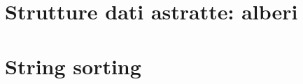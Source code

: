 \documentclass[italian, twoside]{../../../Resources/Utils/ClassNotes}
\begin{document}

\section{Strutture dati astratte: alberi}


\section{String sorting}

\end{document}
